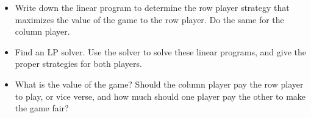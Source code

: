 \documentclass[tikz, 12pt]{scrartcl}
\begin{document}
\begin{enumerate}
	\begin{itemize}
		\item Write down the linear program to determine the row player strategy that maximizes the value of the game to the row player. Do the same for the column player.
		\item Find an LP solver. Use the solver to solve these linear programs, and give the proper strategies for both players.
		\item What is the value of the game? Should the column player pay the row player to play, or vice verse, and how much should one player pay the other to make the game fair?
	\end{itemize}
\end{enumerate}
\end{document}
